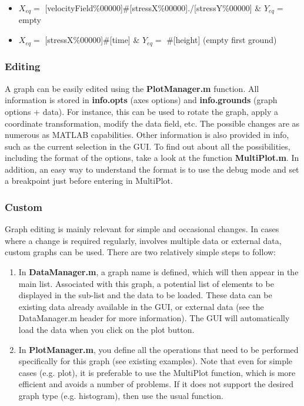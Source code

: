 \documentclass{article}
\begin{document}
\begin{itemize}
    \item $X_{eq}=$ [velocityField\%00000]\#[stressX\%00000]./[stressY\%00000] \& $Y_{eq}=$ empty
    \item $X_{eq}=$ [stressX\%00000]\#[time] \& 
    $Y_{eq}=$ \#[height] (empty first ground)
\end{itemize}

\subsubsection{Editing}

A graph can be easily edited using the \textbf{PlotManager.m} function. All information is stored in \textbf{info.opts} (axes options) and \textbf{info.grounds} (graph options + data). For instance, this can be used to rotate the graph, apply a coordinate transformation, modify the data field, etc. The possible changes are as numerous as MATLAB capabilities. Other information is also provided in info, such as the current selection in the GUI. To find out about all the possibilities, including the format of the options, take a look at the function \textbf{MultiPlot.m}. In addition, an easy way to understand the format is to use the debug mode and set a breakpoint just before entering in MultiPlot.

\subsubsection{Custom}

Graph editing is mainly relevant for simple and occasional changes. In cases where a change is required regularly, involves multiple data or external data, custom graphs can be used. There are two relatively simple steps to follow:

\begin{enumerate}
    \item In \textbf{DataManager.m}, a graph name is defined, which will then appear in the main list. Associated with this graph, a potential list of elements to be displayed in the sub-list and the data to be loaded. These data can be existing data already available in the GUI, or external data (see the DataManager.m header for more information). The GUI will automatically load the data when you click on the plot button. 
    \item In \textbf{PlotManager.m}, you define all the operations that need to be performed specifically for this graph (see existing examples). Note that even for simple cases (e.g. plot), it is preferable to use the MultiPlot function, which is more efficient and avoids a number of problems. If it does not support the desired graph type (e.g. histogram), then use the usual function.
\end{enumerate}
\end{document}

